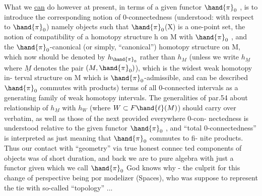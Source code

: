 
What we \uline{can} do however at present,  in terms of a given functor $\hand{\pi}_0$ ,
is to introduce the corresponding notion of 0-connectedness (understood:
with  respect to $\hand{\pi}_0$)  namely objects such that $\hand{\pi}_0$(X) is a one-point set,
the notion of compatibility of a homotopy structure h on M with $\hand{\pi}_0$ ,
and the $\hand{\pi}_0$-canonical (or simply, ``canonical'') homotopy structure on M,
which now should be denoted by  $h_{\hand{\pi}_0}$  rather than $h_M$  (unless we write $h_{\underline{M}}$
where $\underline{M}$  denotes the pair $(M,\hand{\pi}_0)$), which is the widest weak homotopy in-%
terval structure on M which is $\hand{\pi}_0$-admissible,  and can be described 
$\hand{\pi}_0$ commutes with  products)  terms of all 0-connected intervals as a
generating family of weak homotopy intervals.  The generalities of par.54
about relationship of $h_{\underline{M}}$ with $h_W$  (where $W\subset F\hand{\ell}(M)$)  should carry over
verbatim,  as well as those of the next  provided everywhere  0-con-%
nectedness is understood relative to the given functor $\hand{\pi}_0$ ,  and ``total
0-connectedness''  is interpreted as just meaning that $\hand{\pi}_0$ commutes to fi-%
nite products.  Thus our contact with ``geometry'' via true honest connec%
ted components of objects was of short duration,  and back we are to pure
algebra with just a functor given which we call $\hand{\pi}_0$ God knows why  -  the
culprit for this change of perspective being por modelizer (Spaces),
who was suppose to represent the tie with so-called ``topology'' ...


